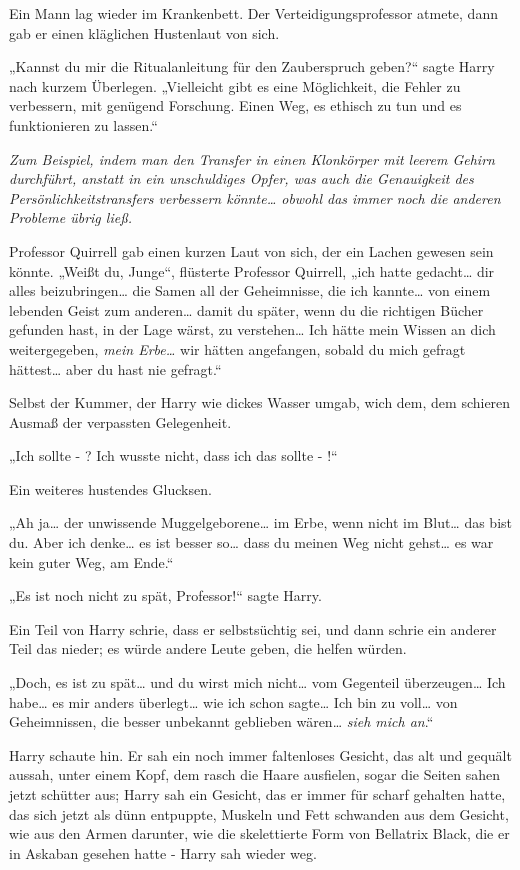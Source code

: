 {Ein Mann lag wieder im Krankenbett. Der Verteidigungsprofessor atmete, dann gab er einen kläglichen Hustenlaut von sich.

„Kannst du mir die Ritualanleitung für den Zauberspruch geben?“ sagte Harry nach kurzem Überlegen. „Vielleicht gibt es eine Möglichkeit, die Fehler zu verbessern, mit genügend Forschung. Einen Weg, es ethisch zu tun und es funktionieren zu lassen.“

\emph{Zum Beispiel, indem man den Transfer in einen Klonkörper mit leerem Gehirn durchführt, anstatt in ein unschuldiges Opfer, was auch die Genauigkeit des Persönlichkeitstransfers verbessern könnte… obwohl das immer noch die anderen Probleme übrig ließ.}

Professor Quirrell gab einen kurzen Laut von sich, der ein Lachen gewesen sein könnte. „Weißt du, Junge“, flüsterte Professor Quirrell, „ich hatte gedacht… dir alles beizubringen… die Samen all der Geheimnisse, die ich kannte… von einem lebenden Geist zum anderen… damit du später, wenn du die richtigen Bücher gefunden hast, in der Lage wärst, zu verstehen… Ich hätte mein Wissen an dich weitergegeben, \emph{mein Erbe…} wir hätten angefangen, sobald du mich gefragt hättest… aber du hast nie gefragt.“

Selbst der Kummer, der Harry wie dickes Wasser umgab, wich dem, dem schieren Ausmaß der verpassten Gelegenheit.

„Ich sollte - ? Ich wusste nicht, dass ich das sollte - !“

Ein weiteres hustendes Glucksen.

„Ah ja… der unwissende Muggelgeborene… im Erbe, wenn nicht im Blut… das bist du. Aber ich denke… es ist besser so… dass du meinen Weg nicht gehst… es war kein guter Weg, am Ende.“

„Es ist noch nicht zu spät, Professor!“ sagte Harry.

Ein Teil von Harry schrie, dass er selbstsüchtig sei, und dann schrie ein anderer Teil das nieder; es würde andere Leute geben, die helfen würden.

„Doch, es ist zu spät… und du wirst mich nicht… vom Gegenteil überzeugen… Ich habe… es mir anders überlegt… wie ich schon sagte… Ich bin zu voll… von Geheimnissen, die besser unbekannt geblieben wären… \emph{sieh mich an}.“

Harry schaute hin. Er sah ein noch immer faltenloses Gesicht, das alt und gequält aussah, unter einem Kopf, dem rasch die Haare ausfielen, sogar die Seiten sahen jetzt schütter aus; Harry sah ein Gesicht, das er immer für scharf gehalten hatte, das sich jetzt als dünn entpuppte, Muskeln und Fett schwanden aus dem Gesicht, wie aus den Armen darunter, wie die skelettierte Form von Bellatrix Black, die er in Askaban gesehen hatte - Harry sah wieder weg.

}

